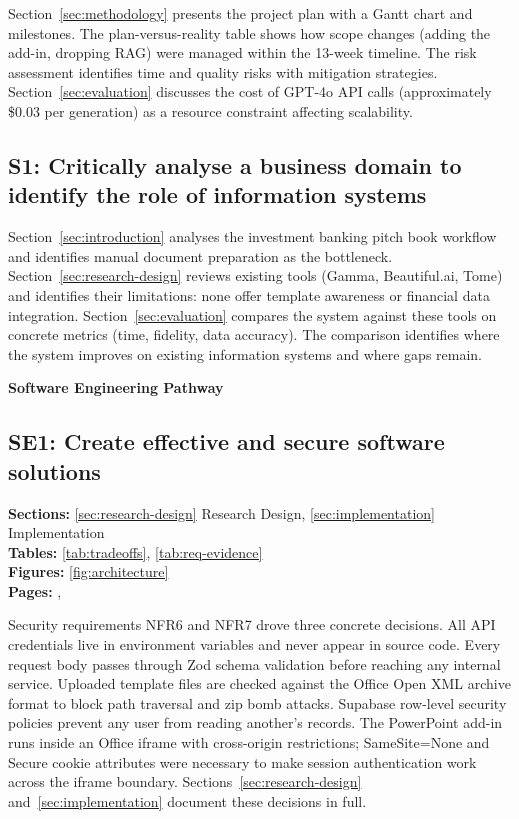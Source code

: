 Section~\ref{sec:methodology} presents the project plan with a Gantt chart and milestones. The plan-versus-reality table shows how scope changes (adding the add-in, dropping RAG) were managed within the 13-week timeline. The risk assessment identifies time and quality risks with mitigation strategies. Section~\ref{sec:evaluation} discusses the cost of GPT-4o API calls (approximately \$0.03 per generation) as a resource constraint affecting scalability.

\subsection*{S1: Critically analyse a business domain to identify the role of information systems}

Section~\ref{sec:introduction} analyses the investment banking pitch book workflow and identifies manual document preparation as the bottleneck. Section~\ref{sec:research-design} reviews existing tools (Gamma, Beautiful.ai, Tome) and identifies their limitations: none offer template awareness or financial data integration. Section~\ref{sec:evaluation} compares the system against these tools on concrete metrics (time, fidelity, data accuracy). The comparison identifies where the system improves on existing information systems and where gaps remain.

\vspace{1.5em}
\noindent\textbf{\large Software Engineering Pathway}
\vspace{0.5em}

\subsection*{SE1: Create effective and secure software solutions}

\noindent\textbf{Sections:} \ref{sec:research-design} Research Design, \ref{sec:implementation} Implementation\\
\noindent\textbf{Tables:} \ref{tab:tradeoffs}, \ref{tab:req-evidence}\\
\noindent\textbf{Figures:} \ref{fig:architecture}\\
\noindent\textbf{Pages:} \pageref{sec:research-design}, \pageref{sec:implementation}

Security requirements NFR6 and NFR7 drove three concrete decisions. All API credentials live in environment variables and never appear in source code. Every request body passes through Zod schema validation before reaching any internal service. Uploaded template files are checked against the Office Open XML archive format to block path traversal and zip bomb attacks. Supabase row-level security policies prevent any user from reading another's records. The PowerPoint add-in runs inside an Office iframe with cross-origin restrictions; SameSite=None and Secure cookie attributes were necessary to make session authentication work across the iframe boundary. Sections~\ref{sec:research-design} and~\ref{sec:implementation} document these decisions in full.

